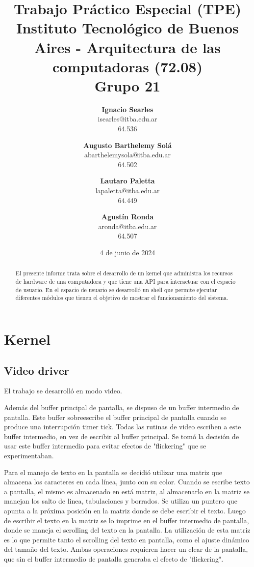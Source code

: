 \documentclass{article}
\title{\textbf{Trabajo Práctico Especial (TPE)} \\ [1ex]
\large Instituto Tecnológico de Buenos Aires - Arquitectura de las computadoras (72.08) \\ [1ex]
\large Grupo 21 }
\date{4 de junio de 2024}
\author{
\textbf{Ignacio Searles}\\
isearles@itba.edu.ar\\
64.536
\and
\textbf{Augusto Barthelemy Solá}\\
abarthelemysola@itba.edu.ar\\
64.502
\and
\textbf{Lautaro Paletta}\\
lapaletta@itba.edu.ar\\
64.449
\and
\textbf{Agustín Ronda}\\
aronda@itba.edu.ar\\
64.507
}
\begin{document}
\maketitle

\begin {abstract}

El presente informe trata sobre el desarrollo de un kernel que administra los recursos de hardware de una computadora y que tiene una API para interactuar con el espacio de usuario. En el espacio de usuario se desarrolló un shell que permite ejecutar diferentes módulos que tienen el objetivo de mostrar el funcionamiento del sistema.

\end {abstract}

\section {Kernel}

\subsection {Video driver}

El trabajo se desarrolló en modo video.

Además del buffer principal de pantalla, se dispuso de un buffer intermedio de pantalla. Este buffer sobreescribe el buffer principal de pantalla cuando se produce una interrupción timer tick. Todas las rutinas de video escriben a este buffer intermedio, en vez de escribir al buffer principal. Se tomó la decisión de usar este buffer intermedio para evitar efectos de "flickering" que se experimentaban.

Para el manejo de texto en la pantalla se decidió utilizar una matriz que almacena los caracteres en cada línea, junto con su color. Cuando se escribe texto a pantalla, el mismo es almacenado en está matriz, al almacenarlo en la matriz se manejan los salto de linea, tabulaciones y borrados. Se utiliza un puntero que apunta a la próxima posición en la matriz donde se debe escribir el texto. Luego de escribir el texto en la matriz se lo imprime en el buffer intermedio de pantalla, donde se maneja el scrolling del texto en la pantalla. La utilización de esta matriz es lo que permite tanto el scrolling del texto en pantalla, como el ajuste dinámico del tamaño del texto. Ambas operaciones requieren hacer un clear de la pantalla, que sin el buffer intermedio de pantalla generaba el efecto de "flickering".
\end{document}

